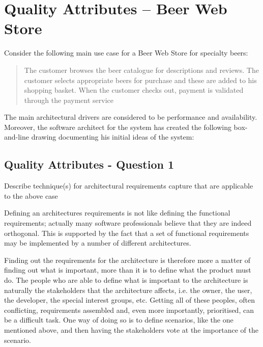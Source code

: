 \section{Quality Attributes -- Beer Web Store}

Consider the following main use case for a Beer Web Store for specialty
beers:

\begin{quote}
  The customer browses the beer catalogue for descriptions and
  reviews. The customer selects appropriate beers for purchase and
  these are added to his shopping basket. When the customer checks
  out, payment is validated through the payment service
\end{quote}
The main architectural drivers are considered to be performance and
availability. Moreover, the software architect for the system has
created the following box-and-line drawing documenting his initial
ideas of the system:
\begin{figure}[h!]
  \centerline{}
\end{figure}

\subsection{Quality Attributes - Question 1}

\begin{question}
Describe technique(s) for architectural requirements capture
that are applicable to the above case
\end{question}

Defining an architectures requirements is not like defining the functional requirements; actually many software professionals believe that they are indeed orthogonal. This is supported by the fact that a set of functional requirements may be implemented by a number of different architectures.

Finding out the requirements for the architecture is therefore more a matter of finding out what is important, more than it is to define what the product must do. The people who are able to define what is important to the architecture is naturally the stakeholders that the architecture affects, i.e. the owner, the user, the developer, the special interest groups, etc. Getting all of these peoples, often conflicting, requirements assembled and, even more importantly, prioritised, can be a difficult task. One way of doing so is to define scenarios, like the one mentioned above, and then having the stakeholders vote at the importance of the scenario. 

